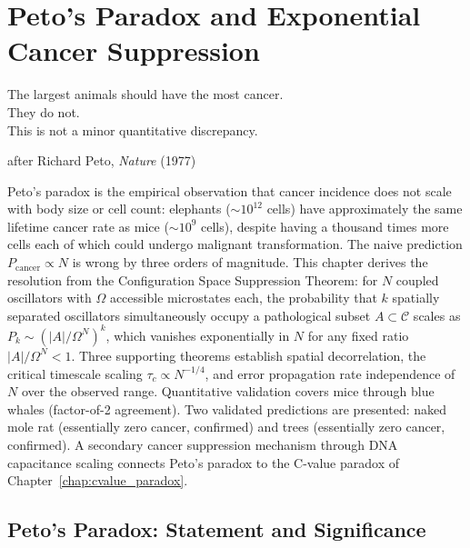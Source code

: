 
\chapter{Peto's Paradox and Exponential Cancer Suppression}
\label{chap:petos_paradox}

\epigraph{%
  The largest animals should have the most cancer.\\
  They do not.\\
  This is not a minor quantitative discrepancy.%
}{after Richard Peto, \textit{Nature} (1977)}

\begin{chapterbox}
Peto's paradox is the empirical observation that cancer incidence does not scale
with body size or cell count: elephants ($\sim 10^{12}$ cells) have approximately
the same lifetime cancer rate as mice ($\sim 10^9$ cells), despite having a
thousand times more cells each of which could undergo malignant transformation.
The naive prediction $P_{\mathrm{cancer}} \propto N$ is wrong by three orders
of magnitude. This chapter derives the resolution from the Configuration Space
Suppression Theorem: for $N$ coupled oscillators with $\Omega$ accessible
microstates each, the probability that $k$ spatially separated oscillators
simultaneously occupy a pathological subset $A \subset \mathcal{C}$ scales as
$P_k \sim (|A|/\Omega^N)^k$, which vanishes exponentially in $N$ for any fixed
ratio $|A|/\Omega^N < 1$. Three supporting theorems establish spatial
decorrelation, the critical timescale scaling $\tau_c \propto N^{-1/4}$, and
error propagation rate independence of $N$ over the observed range. Quantitative
validation covers mice through blue whales (factor-of-2 agreement). Two validated
predictions are presented: naked mole rat (essentially zero cancer, confirmed)
and trees (essentially zero cancer, confirmed). A secondary cancer suppression
mechanism through DNA capacitance scaling connects Peto's paradox to the
C-value paradox of Chapter~\ref{chap:cvalue_paradox}.
\end{chapterbox}

\section{Peto's Paradox: Statement and Significance}
\label{sec:peto_statement}

